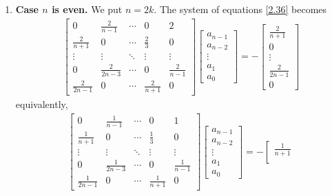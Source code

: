 \documentclass[a4paper]{article}
\numberwithin{equation}{section}
\begin{document}
\begin{enumerate}
\item \textbf{Case $n$ is even.} We put $n=2k$. The system of equations \eqref{2.36} becomes
\begin{align}
\left[ {\begin{array}{*{20}{c}}
0&{\frac{2}{{n - 1}}}& \cdots &0&2\\
{\frac{2}{{n + 1}}}&0& \cdots &{\frac{2}{3}}&0\\
 \vdots & \vdots & \ddots & \vdots & \vdots \\
0&{\frac{2}{{2n - 3}}}& \cdots &0&{\frac{2}{{n - 1}}}\\
{\frac{2}{{2n - 1}}}&0& \cdots &{\frac{2}{{n + 1}}}&0
\end{array}} \right]\left[ {\begin{array}{*{20}{c}}
{{a_{n - 1}}}\\
{{a_{n - 2}}}\\
 \vdots \\
{{a_1}}\\
{{a_0}}
\end{array}} \right] =  - \left[ {\begin{array}{*{20}{c}}
{\frac{2}{{n + 1}}}\\
0\\
 \vdots \\
{\frac{2}{{2n - 1}}}\\
0
\end{array}} \right]
\end{align}
equivalently,
\begin{align}
\left[ {\begin{array}{*{20}{c}}
0&{\frac{1}{{n - 1}}}& \cdots &0&1\\
{\frac{1}{{n + 1}}}&0& \cdots &{\frac{1}{3}}&0\\
 \vdots & \vdots & \ddots & \vdots & \vdots \\
0&{\frac{1}{{2n - 3}}}& \cdots &0&{\frac{1}{{n - 1}}}\\
{\frac{1}{{2n - 1}}}&0& \cdots &{\frac{1}{{n + 1}}}&0
\end{array}} \right]\left[ {\begin{array}{*{20}{c}}
{{a_{n - 1}}}\\
{{a_{n - 2}}}\\
 \vdots \\
{{a_1}}\\
{{a_0}}
\end{array}} \right] =  - \left[ {\begin{array}{*{20}{c}}
{\frac{1}{{n + 1}}}\\

\end{array}}
\end{align}
\end{enumerate}
\end{document}
